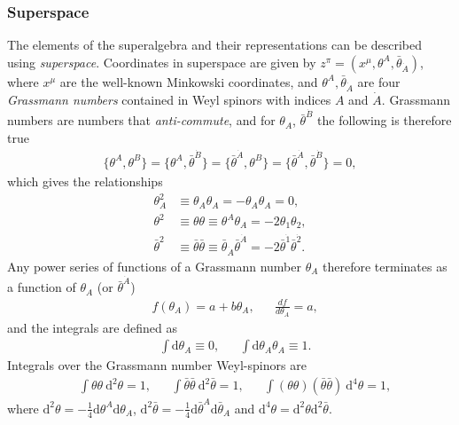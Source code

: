 \documentclass[twoside,english]{uiofysmaster}
\begin{document}
\subsubsection{Superspace}

The elements of the superalgebra and their representations can be described using \textit{superspace}. Coordinates in superspace are given by $z^{\pi} = (x^{\mu}, \theta^A, \bar{\theta}_{\dot{A}})$, where $x^{\mu}$ are the well-known Minkowski coordinates, and $\theta^A, \bar{\theta}_{\dot{A}}$ are four \textit{Grassmann numbers} contained in Weyl spinors with indices $A$ and $\dot{A}$. Grassmann numbers are numbers that \textit{anti-commute}, and for $\theta_A$, $\bar{\theta}^{\dot{B}}$ the following is therefore true
\begin{align}
\{ \theta^A, \theta^B\} = \{ \theta^A, \bar{\theta}^{\dot{B}}\} = \{ \bar{\theta}^{\dot{A}}, \theta^B\} = \{ \bar{\theta}^{\dot{A}}, \bar{\theta}^{\dot{B}} \} =0,
\end{align}
which gives the relationships
\begin{align}
\theta_A^2 &\equiv \theta_A \theta_A = - \theta_A \theta_A =  0,\\
\theta^2 &\equiv \theta \theta \equiv \theta^A \theta_A = -2 \theta_1 \theta_2,\\
\bar{\theta}^2 &\equiv \bar{\theta} \bar{\theta} \equiv \bar{\theta}_{\dot{A}} \bar{\theta}^{\dot{A}} = -2 \bar{\theta}^{\dot{1}} \bar{\theta}^{\dot{2}}. 
\end{align}
Any power series of functions of a Grassmann number $\theta_A$ therefore terminates as a function of $\theta_A$ (or $\bar{\theta}^{\dot{A}}$)
\begin{align}
&f(\theta_A) = a + b \theta_A, && \frac{d f}{d \theta_A} = a,
\end{align}
and the integrals are defined as 
\begin{align}
&\int \mathrm{d} \theta_A \equiv 0, && \int \mathrm{d} \theta_A \theta_A \equiv 1.
\end{align}
Integrals over the Grassmann number Weyl-spinors are 
\begin{align}
& \int \theta \theta~\mathrm{d}^2\theta=1, && \int \bar{\theta} \bar{\theta} ~ \mathrm{d}^2 \bar{\theta}=1, && \int (\theta \theta) (\bar{\theta} \bar{\theta})~\mathrm{d}^4 \theta=1,
\end{align}
where $\mathrm{d}^2\theta = - \frac{1}{4} \mathrm{d} \theta^A \mathrm{d}\theta_A$, $\mathrm{d}^2\bar{\theta} = - \frac{1}{4} \mathrm{d} \bar{\theta}^A \mathrm{d}\bar{\theta}_A$ and $\mathrm{d}^4 \theta = \mathrm{d}^2 \theta \mathrm{d}^2 \bar{\theta}$.
\end{document}
